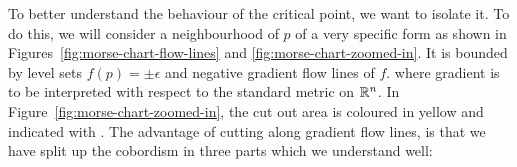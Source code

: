 To better understand the behaviour of the critical point,
we want to isolate it.
To do this, we will consider a neighbourhood of $p$ of a very specific form as shown in Figures~\ref{fig:morse-chart-flow-lines} and \ref{fig:morse-chart-zoomed-in}.
It is bounded by level sets $f(p) = \pm \epsilon$ and negative gradient flow lines of  $f$.
where gradient is to be interpreted with respect to the standard metric on $\mathbb{R}^{n}$.
In Figure~\ref{fig:morse-chart-zoomed-in}, the cut out area is coloured in yellow and indicated with .
The advantage of cutting along gradient flow lines, is that we have split up the cobordism in three parts which we understand well:
